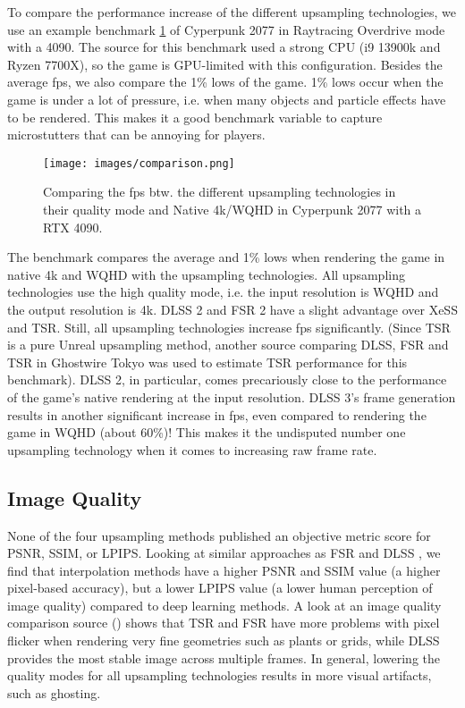 \documentclass[letterpaper, 10 pt, conference]{ieeeconf}  %
\begin{document}
To compare the performance increase of the different upsampling technologies, we use an example benchmark \ref{fig:comparison} of Cyperpunk 2077 in Raytracing Overdrive mode with a 4090.
The source \cite{bench1}\cite{bench2} for this benchmark used a strong CPU (i9 13900k and Ryzen 7700X), so the game is GPU-limited with this configuration. 
Besides the average fps, we also compare the 1\% lows of the game. 
1\% lows occur when the game is under a lot of pressure, i.e. when many objects and particle effects have to be rendered.
This makes it a good benchmark variable to capture microstutters that can be annoying for players.
\begin{figure}[!ht]
    \caption{Comparing the fps btw. the different upsampling technologies in their quality mode and Native 4k/WQHD in Cyperpunk 2077 with a RTX 4090.}
    \centering
    \texttt{[image: images/comparison.png]}
    \label{fig:comparison}
\end{figure}
The benchmark compares the average and 1\% lows when rendering the game in native 4k and WQHD with the upsampling technologies.
All upsampling technologies use the high quality mode, i.e. the input resolution is WQHD and the output resolution is 4k.
DLSS 2 and FSR 2 have a slight advantage over XeSS and TSR. Still, all upsampling technologies increase fps significantly. 
(Since TSR is a pure Unreal upsampling method, another source \cite{bench3} comparing DLSS, FSR and TSR in Ghostwire Tokyo \cite{Ghostwire} was used to estimate TSR performance for this benchmark).
DLSS 2, in particular, comes precariously close to the performance of the game's native rendering at the input resolution.
DLSS 3's frame generation results in another significant increase in fps, even compared to rendering the game in WQHD (about 60\%)!
This makes it the undisputed number one upsampling technology when it comes to increasing raw frame rate.

\subsection{Image Quality}

None of the four upsampling methods published an objective metric score for PSNR, SSIM, or LPIPS.
Looking at similar approaches as FSR \cite{wang2022interpolation} and DLSS \cite{liu2021variational}, we find that interpolation methods have a higher PSNR and SSIM value (a higher pixel-based accuracy),
but a lower LPIPS value (a lower human perception of image quality) compared to deep learning methods.
A look at an image quality comparison source (\cite{bench4}) shows that TSR and FSR have more problems with pixel flicker when rendering very fine geometries such as plants or grids, while DLSS provides the most stable image across multiple frames.
In general, lowering the quality modes for all upsampling technologies results in more visual artifacts, such as ghosting.
\end{document}
